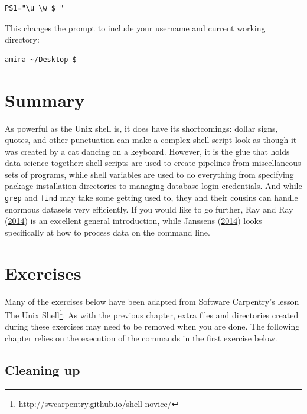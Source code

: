 \documentclass[
]{krantz}
\renewcommand{\href}[2]{#2\footnote{\url{#1}}}
\begin{document}
\begin{verbatim}
PS1="\u \w $ "
\end{verbatim}

This changes the prompt to include your username and current working directory:

\begin{verbatim}
amira ~/Desktop $
\end{verbatim}

\hypertarget{bash-advanced-summary}{%
\section{Summary}\label{bash-advanced-summary}}

As powerful as the Unix shell is,
it does have its shortcomings:
dollar signs, quotes, and other punctuation
can make a complex shell script look as though
it was created by a cat dancing on a keyboard.
However,
it is the glue that holds data science together:
shell scripts are used to create pipelines from miscellaneous sets of programs,
while shell variables are used to do everything from
specifying package installation directories to managing database login credentials.
And while \texttt{grep} and \texttt{find} may take some getting used to,
they and their cousins can handle enormous datasets very efficiently.
If you would like to go further,
Ray and Ray (\protect\hyperlink{ref-Ray2014}{2014}) is an excellent general introduction,
while Janssens (\protect\hyperlink{ref-Jans2014}{2014}) looks specifically at how to process data on the command line.

\hypertarget{bash-advanced-exercises}{%
\section{Exercises}\label{bash-advanced-exercises}}

Many of the exercises below have been adapted from Software Carpentry's lesson
\href{http://swcarpentry.github.io/shell-novice/}{The Unix Shell}.
As with the previous chapter,
extra files and directories created during these exercises
may need to be removed when you are done.
The following chapter relies on the execution of the commands
in the first exercise below.

\hypertarget{bash-advanced-ex-cleaning-up}{%
\subsection{Cleaning up}\label{bash-advanced-ex-cleaning-up}}
\end{document}
